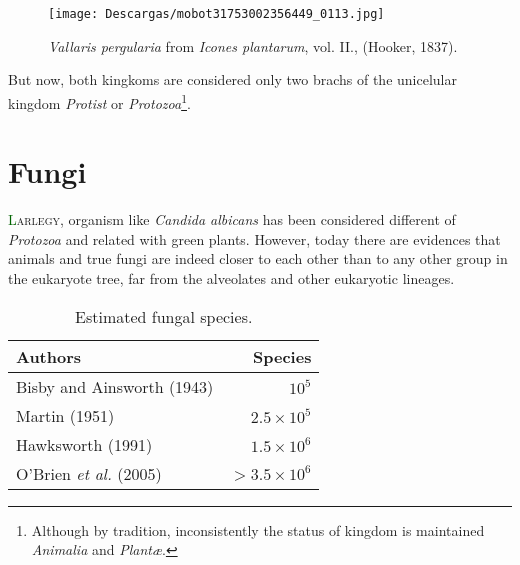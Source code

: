 \begin{wrapfigure}{r}{0.26\textwidth}
\centering
\texttt{[image: Descargas/mobot31753002356449\_0113.jpg]}
\caption{\footnotesize \emph{Vallaris pergularia} from \emph{Icones plantarum}, vol. II., (Hooker, 1837).}
\label{fig1}
\end{wrapfigure}
But now, both kingkoms are considered only two brachs of the unicelular kingdom \emph{Protist} 
or \emph{Protozoa}\footnote{Although by tradition,  inconsistently the status of kingdom 
is maintained \emph{Animalia}  and \emph{Plant\ae}.}.  
\lipsum[2]

\lipsum[3]

\ornamento

\section{Fungi}

\lettrine[lines=3]{\initfamily\textcolor{darkgreen}{L}}{arlegy}, organism like \emph{Candida albicans} has
 been considered different of \emph{Protozoa} and related with green plants. However, today there 
 are evidences that animals and true fungi are indeed closer to each other than to any other group 
 in the eukaryote tree, far from the alveolates and other eukaryotic lineages.  

\begin{wraptable}{r}{7 cm}
\vspace{-.5cm}
\centering
\footnotesize
\caption{\label{wraptab}Estimated fungal species.}
\begin{tabular}{lr}\\\toprule  
Authors & Species \\\midrule
Bisby and Ainsworth (1943) & $10^5$ \\  
Martin (1951) &  $2.5\times10^5$  \\
Hawksworth (1991) & $1.5\times10^6$ \\ 
O’Brien \emph{et al.} (2005) & $>3.5\times10^6$ \\  \bottomrule
\end{tabular}
\end{wraptable} 


\lipsum[4-6]

